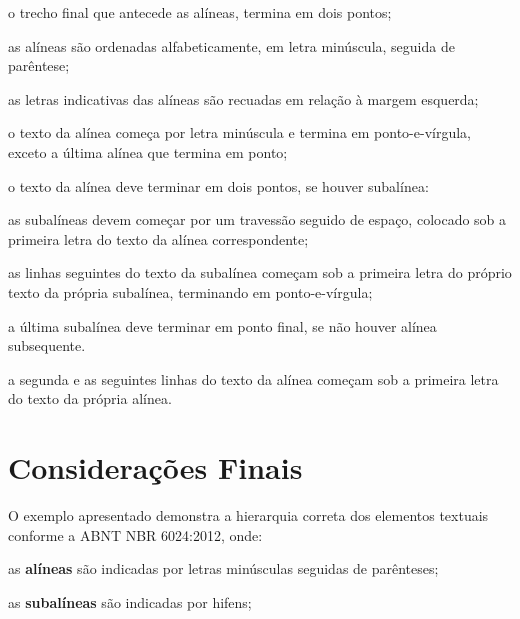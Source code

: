 \begin{alineas}
\item o trecho final que antecede as alíneas, termina em dois pontos;
\item as alíneas são ordenadas alfabeticamente, em letra minúscula, seguida
de parêntese;
\item  as letras indicativas das alíneas são recuadas em relação à margem
esquerda;
\item  o texto da alínea começa por letra minúscula e termina em ponto-e-vírgula, exceto a última alínea que termina em ponto;
\item o texto da alínea deve terminar em dois pontos, se houver subalínea:
\begin{subalineas}
\item as subalíneas devem começar por um travessão seguido de espaço,
colocado sob a primeira letra do texto da alínea correspondente;
\item  as linhas seguintes do texto da subalínea começam sob a primeira letra
do próprio texto da própria subalínea, terminando em ponto-e-vírgula;
\item  a última subalínea deve terminar em ponto final, se não houver alínea
subsequente.
\end{subalineas}
\item  a segunda e as seguintes linhas do texto da alínea começam sob a
primeira letra do texto da própria alínea.
\end{alineas}

\section{Considerações Finais}

O exemplo apresentado demonstra a hierarquia correta dos elementos textuais conforme a ABNT NBR 6024:2012, onde:

\begin{alineas}
    \item as \textbf{alíneas} são indicadas por letras minúsculas seguidas de parênteses;
    \item as \textbf{subalíneas} são indicadas por hifens;
\end{alineas}

\bigskip


